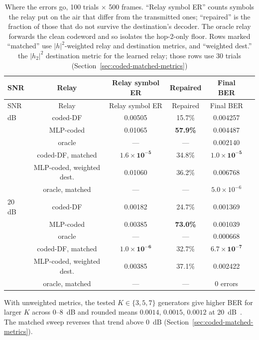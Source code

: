 \begin{longtable}[]{@{}lccccc@{}}
\caption[Where the errors go: relay output versus destination output]{Where the errors go, 100 trials $\times$ 500 frames. ``Relay symbol ER'' counts symbols the relay put on the air that differ from the transmitted ones; ``repaired'' is the fraction of those that do not survive the destination's decoder. The oracle relay forwards the clean codeword and so isolates the hop-2-only floor. Rows marked ``matched'' use $|h|^{2}$-weighted relay and destination metrics, and ``weighted dest.'' the $|h_2|^{2}$ destination metric for the learned relay; those rows use 30 trials (Section~\ref{sec:coded-matched-metrics})}\label{tbl:table38}\tabularnewline
\toprule\noalign{}
SNR & Relay & Relay symbol ER & Repaired & Final BER \\
\midrule\noalign{}
\endfirsthead
\toprule\noalign{}
SNR & Relay & Relay symbol ER & Repaired & Final BER \\
\midrule\noalign{}
\endhead
\bottomrule\noalign{}
\endlastfoot
16 dB & coded-DF & 0.00505 & 15.7\% & 0.004257 \\
 & MLP-coded & 0.01065 & \textbf{57.9\%} & 0.004487 \\
 & oracle & --- & --- & 0.002140 \\
 & coded-DF, matched & $\mathbf{1.6\times10^{-5}}$ & 34.8\% & $\mathbf{1.0\times10^{-5}}$ \\
 & MLP-coded, weighted dest. & 0.01060 & 36.2\% & 0.006768 \\
 & oracle, matched & --- & --- & $5.0\times10^{-6}$ \\
\hline
20 dB & coded-DF & 0.00182 & 24.7\% & 0.001369 \\
 & MLP-coded & 0.00385 & \textbf{73.0\%} & 0.001039 \\
 & oracle & --- & --- & 0.000668 \\
 & coded-DF, matched & $\mathbf{1.0\times10^{-6}}$ & 32.7\% & $\mathbf{6.7\times10^{-7}}$ \\
 & MLP-coded, weighted dest. & 0.00385 & 37.1\% & 0.002422 \\
 & oracle, matched & --- & --- & 0 errors \\
\end{longtable}

With unweighted metrics, the tested $K\in\{3,5,7\}$ generators give higher BER for larger $K$ across 0--8~dB and rounded means $0.0014$, $0.0015$, $0.0012$ at 20~dB~. The matched sweep reverses that trend above 0~dB (Section~\ref{sec:coded-matched-metrics}).

